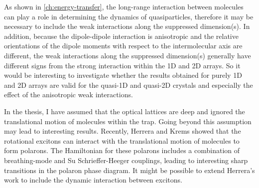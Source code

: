 As shown in \autoref{ch:energy-transfer}, the long-range interaction between molecules can play a role in determining
the dynamics of quasiparticles, therefore it may be necessary to include the weak interactions along the suppressed dimension(s). 
In addition, because the dipole-dipole interaction is anisotropic and the relative orientations of the dipole moments with respect to the intermolecular axis are different, the weak interactions along the suppressed dimension(s) generally have different signs from the strong interaction within the 1D and 2D arrays. So it would be interesting to investigate whether the results obtained for purely 1D and 2D arrays are valid for the quasi-1D and quasi-2D crystals and especially the effect of 
the anisotropic weak interactions. 


 In the thesis, 
I have assumed that the optical lattices are deep and ignored the translational motion of molecules within the trap. 
Going beyond this assumption may lead to interesting results. 
Recently, Herrera and Krems showed that the rotational excitons can interact with the translational motion of molecules to
form polarons\cite{felipe-polarons}. The Hamiltonian for these polarons includes a combination of  breathing-mode and 
Su Schrieffer-Heeger couplings, leading to interesting sharp transitions in the polaron phase diagram\cite{felipe-arxive-polaron}. It might be possible to extend Herrera's work to include the dynamic interaction between excitons. 

